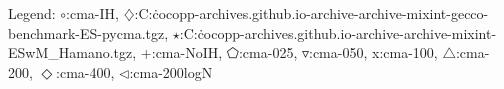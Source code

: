 Legend: {\color{CornflowerBlue}$\circ$}:cma-IH, {\color{Orange}$\diamondsuit$}:C:\Users\tristan\.cocopp\data-archives\numbbo.github.io\data-archive\data-archive\bbob-mixint-gecco-benchmark\CMA-ES-pycma.tgz, {\color{Green}$\star$}:C:\Users\tristan\.cocopp\data-archives\numbbo.github.io\data-archive\data-archive\bbob-mixint\CMA-ESwM\_Hamano.tgz, {\color{red}+}:cma-NoIH, {\color{magenta}$\pentagon$}:cma-025, {\color{brown}$\triangledown$}:cma-050, {{}x}:cma-100, {{}$\triangle$}:cma-200, {{}$\Diamond$}:cma-400, {{}$\triangleleft$}:cma-200logN